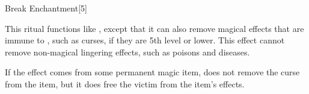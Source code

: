 \begin{spellsection}{Break Enchantment}[5]
    \begin{spellheader}
    \end{spellheader}
    \begin{spellcontent}
        \begin{spelltargetinginfo}
        \end{spelltargetinginfo}
        \begin{spelleffects}
            \spelleffect This ritual functions like , except that it can also remove magical effects that are immune to , such as curses, if they are 5th level or lower.
            This effect cannot remove non-magical lingering effects, such as poisons and diseases.
            \par If the effect comes from some permanent magic item,  does not remove the curse from the item, but it does free the victim from the item's effects.  %
        \end{spelleffects}
    \end{spellcontent}
    \begin{spellfooter}
    \end{spellfooter}
    \begin{spellaugments}
    \end{spellaugments}
\end{spellsection}

